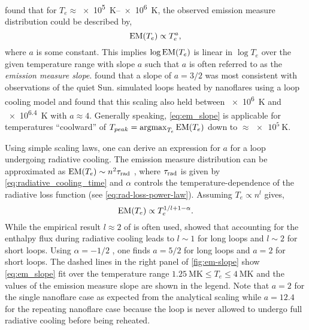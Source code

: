 \citet{jordan_structure_1975,jordan_structure_1976} found that for $T_e\approx$\SIrange{e5}{e6}{\kelvin}, the observed emission measure distribution could be described by,
\begin{equation}\label{eq:em_slope}
    \textup{EM}(T_e) \propto T_e^a,
\end{equation}
where $a$ is some constant. This implies $\log{\textup{EM}(T_e)}$ is linear in $\log{T_e}$ over the given temperature range with slope $a$ such that $a$ is often referred to as the \textit{emission measure slope}. \citet{athay_theoretical_1966,jordan_energy_1980} found that a slope of $a=3/2$ was most consistent with observations of the quiet Sun. \citet{cargill_implications_1994} simulated loops heated by nanoflares using a loop cooling model and found that this scaling also held between \SI{e6}{\kelvin} and \SI{e6.4}{\kelvin} with $a\approx4$. Generally speaking, \autoref{eq:em_slope} is applicable for temperatures ``coolward'' of $T_{peak}=\operatorname*{argmax}_{T_e}\textup{EM}(T_e)$ down to $\approx\SI{e5}{\kelvin}$.

Using simple scaling laws, one can derive an expression for $a$ for a loop undergoing radiative cooling. The emission measure distribution can be approximated as $\textup{EM}(T_e)\sim n^2\tau_\textup{rad}$ \citep{cargill_implications_1994}, where $\tau_\textup{rad}$ is given by \autoref{eq:radiative_cooling_time} and $\alpha$ controls the temperature-dependence of the radiative loss function (see \autoref{eq:rad-loss-power-law}). Assuming $T_e\propto n^{l}$ gives,
\begin{equation}
    \textup{EM}(T_e) \propto T_e^{1/l + 1 - \alpha}.
\end{equation}
While the empirical result $l\approx2$ of \citet{serio_dynamics_1991,jakimiec_dynamics_1992} is often used, \citet{bradshaw_cooling_2010} showed that accounting for the enthalpy flux during radiative cooling leads to $l\sim1$ for long loops and $l\sim2$ for short loops. Using $\alpha=-1/2$ \citep[from the scaling laws of][see \autoref{sec:scaling_laws}]{rosner_dynamics_1978}, one finds $a=5/2$ for long loops and $a=2$ for short loops. The dashed lines in the right panel of \autoref{fig:em-slope} show \autoref{eq:em_slope} fit over the temperature range $\SI{1.25}{\mega\kelvin}\le T_e\le\SI{4}{\mega\kelvin}$ and the values of the emission measure slope are shown in the legend. Note that $a=2$ for the single nanoflare case as expected from the analytical scaling while $a=12.4$ for the repeating nanoflare case because the loop is never allowed to undergo full radiative cooling before being reheated. 

